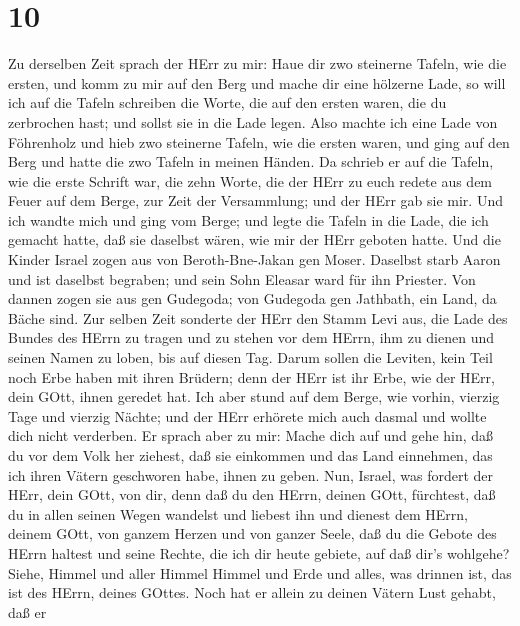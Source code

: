 \hypertarget{section-9}{%
\section{10}\label{section-9}}

 Zu derselben Zeit sprach der HErr zu mir: Haue dir zwo
steinerne Tafeln, wie die ersten, und komm zu mir auf den Berg und mache
dir eine hölzerne Lade,  so will ich auf die Tafeln
schreiben die Worte, die auf den ersten waren, die du zerbrochen hast;
und sollst sie in die Lade legen.  Also machte ich eine Lade
von Föhrenholz und hieb zwo steinerne Tafeln, wie die ersten waren, und
ging auf den Berg und hatte die zwo Tafeln in meinen Händen.
 Da schrieb er auf die Tafeln, wie die erste Schrift war,
die zehn Worte, die der HErr zu euch redete aus dem Feuer auf dem Berge,
zur Zeit der Versammlung; und der HErr gab sie mir.  Und ich
wandte mich und ging vom Berge; und legte die Tafeln in die Lade, die
ich gemacht hatte, daß sie daselbst wären, wie mir der HErr geboten
hatte.  Und die Kinder Israel zogen aus von Beroth-Bne-Jakan
gen Moser. Daselbst starb Aaron und ist daselbst begraben; und sein Sohn
Eleasar ward für ihn Priester.  Von dannen zogen sie aus gen
Gudegoda; von Gudegoda gen Jathbath, ein Land, da Bäche sind.
 Zur selben Zeit sonderte der HErr den Stamm Levi aus, die
Lade des Bundes des HErrn zu tragen und zu stehen vor dem HErrn, ihm zu
dienen und seinen Namen zu loben, bis auf diesen Tag.  Darum
sollen die Leviten, kein Teil noch Erbe haben mit ihren Brüdern; denn
der HErr ist ihr Erbe, wie der HErr, dein GOtt, ihnen geredet hat.
 Ich aber stund auf dem Berge, wie vorhin, vierzig Tage und
vierzig Nächte; und der HErr erhörete mich auch dasmal und wollte dich
nicht verderben.  Er sprach aber zu mir: Mache dich auf und
gehe hin, daß du vor dem Volk her ziehest, daß sie einkommen und das
Land einnehmen, das ich ihren Vätern geschworen habe, ihnen zu geben.
 Nun, Israel, was fordert der HErr, dein GOtt, von dir,
denn daß du den HErrn, deinen GOtt, fürchtest, daß du in allen seinen
Wegen wandelst und liebest ihn und dienest dem HErrn, deinem GOtt, von
ganzem Herzen und von ganzer Seele,  daß du die Gebote des
HErrn haltest und seine Rechte, die ich dir heute gebiete, auf daß dir's
wohlgehe?  Siehe, Himmel und aller Himmel Himmel und Erde
und alles, was drinnen ist, das ist des HErrn, deines GOttes.
 Noch hat er allein zu deinen Vätern Lust gehabt, daß er
